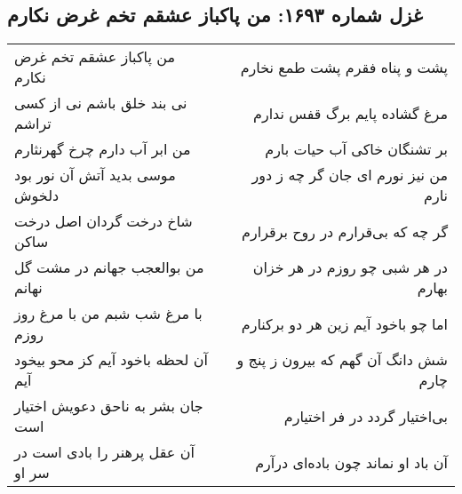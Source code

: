 \begin{center}
\section*{غزل شماره ۱۶۹۳: من پاکباز عشقم تخم غرض نکارم}
\label{sec:1693}
\begin{longtable}{l p{0.5cm} r}
من پاکباز عشقم تخم غرض نکارم
&&
پشت و پناه فقرم پشت طمع نخارم
\\
نی بند خلق باشم نی از کسی تراشم
&&
مرغ گشاده پایم برگ قفس ندارم
\\
من ابر آب دارم چرخ گهرنثارم
&&
بر تشنگان خاکی آب حیات بارم
\\
موسی بدید آتش آن نور بود دلخوش
&&
من نیز نورم ای جان گر چه ز دور نارم
\\
شاخ درخت گردان اصل درخت ساکن
&&
گر چه که بی‌قرارم در روح برقرارم
\\
من بوالعجب جهانم در مشت گل نهانم
&&
در هر شبی چو روزم در هر خزان بهارم
\\
با مرغ شب شبم من با مرغ روز روزم
&&
اما چو باخود آیم زین هر دو برکنارم
\\
آن لحظه باخود آیم کز محو بیخود آیم
&&
شش دانگ آن گهم که بیرون ز پنج و چارم
\\
جان بشر به ناحق دعویش اختیار است
&&
بی‌اختیار گردد در فر اختیارم
\\
آن عقل پرهنر را بادی است در سر او
&&
آن باد او نماند چون باده‌ای درآرم
\\
\end{longtable}
\end{center}
